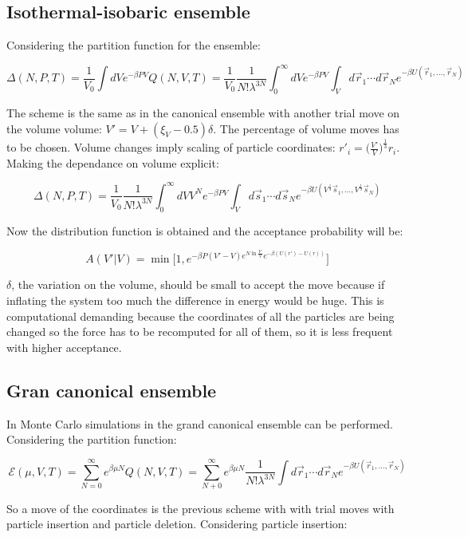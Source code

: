 	\subsection{Isothermal-isobaric ensemble}
	Considering the partition function for the ensemble:

	$$\Delta(N, P, T) = \frac{1}{V_0} \int dVe^{-\beta PV}Q(N, V, T) = \frac{1}{V_0}\frac{1}{N!\lambda^{3N}}\int_0^{\infty}dVe^{-\beta PV}\int_Vd\vec{r}_1\cdots d\vec{r}_Ne^{-\beta U(\vec{r}_1, \dots, \vec{r}_N)}$$

	The scheme is the same as in the canonical ensemble with another trial move on the volume volume: $V' = V + (\xi_V-0.5)\delta$.
	The percentage of volume moves has to be chosen.
	Volume changes imply scaling of particle coordinates: $r'_i = \biggl(\frac{V'}{V}\biggr)^{\frac{1}{3}}r_i$.
	Making the dependance on volume explicit:

	$$\Delta(N, P, T) = \frac{1}{V_0}\frac{1}{N!\lambda^{3N}}\int_0^{\infty}dVV^Ne^{-\beta PV}\int_Vd\vec{s}_1\cdots d\vec{s}_Ne^{-\beta U(V^{\frac{1}{3}}\vec{s}_1,\dots, V^{\frac{1}{3}}\vec{s}_N)}$$

	Now the distribution function is obtained and the acceptance probability will be:

	$$A(V'|V) = \min\bigl[1, e^{-\beta P(V'-V)e^{N\ln \frac{V'}{V}}e^{-\beta(U(r')-U(r))}}\bigr]$$

	$\delta$, the variation on the volume, should be small to accept the move because if inflating the system too much the difference in energy would be huge.
	This is computational demanding because the coordinates of all the particles are being changed so the force has to be recomputed for all of them, so it is less frequent with higher acceptance.

	\subsection{Gran canonical ensemble}
	In Monte Carlo simulations in the grand canonical ensemble can be performed.
	Considering the partition function:

	$$\mathcal{E}(\mu, V, T) = \sum\limits_{N=0}^{\infty}e^{\beta\mu N}Q(N, V, T) = \sum\limits_{N+0}^{\infty}e^{\beta\mu N}\frac{1}{N!\lambda^{3N}}\int d\vec{r}_1\cdots d\vec{r}_Ne^{-\beta U(\vec{r}_1, \dots, \vec{r}_N)}$$

	So a move of the coordinates is the previous scheme with with trial moves with particle insertion and particle deletion.
	Considering particle insertion:

